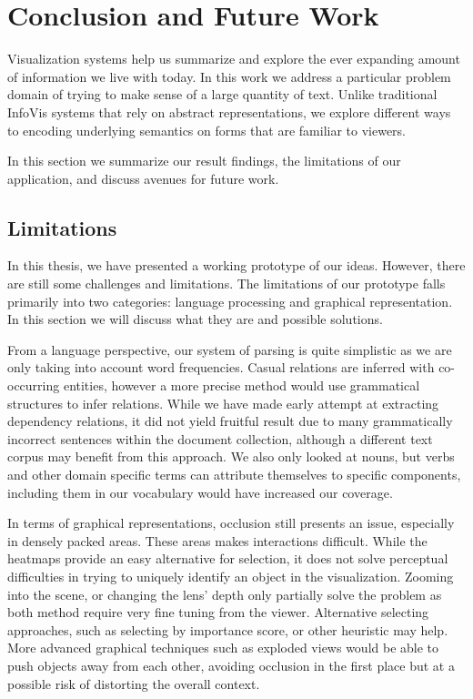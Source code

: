 %
\chapter{Conclusion and Future Work}
Visualization systems help us summarize and explore the ever expanding amount of
information we live with today. In this work we address a particular problem
domain of trying to make sense of a large quantity of text. Unlike traditional
InfoVis systems that rely on abstract representations, we explore different ways
to encoding underlying semantics on forms that are familiar to viewers. 

In this section we summarize our result findings, the limitations of our
application, and discuss avenues for future work.

\section{Limitations}
In this thesis, we have presented a working prototype of our ideas. However,
there are still some challenges and limitations. The limitations of our
prototype falls primarily into two categories: language processing and graphical
representation. In this section we will discuss what they are and possible
solutions.

From a language perspective, our system of parsing is quite simplistic as we are
only taking into account word frequencies. Casual relations are inferred with
co-occurring entities, however a more precise method would use grammatical
structures to infer relations. While we have made early attempt at extracting
dependency relations, it did not yield fruitful result due to many grammatically
incorrect sentences within the document collection, although a different text
corpus may benefit from this approach. We also only looked at nouns, but verbs
and other domain specific terms can attribute themselves to specific components,
including them in our vocabulary would have increased our coverage.

In terms of graphical representations, occlusion still presents an issue,
especially in densely packed areas. These areas makes interactions difficult.
While the heatmaps provide an easy alternative for selection, it does not solve
perceptual difficulties in trying to uniquely identify an object in the
visualization. Zooming into the scene, or changing the lens' depth only
partially solve the problem as both method require very fine tuning from the
viewer. Alternative selecting approaches, such as selecting by importance score,
or other heuristic may help. More advanced graphical techniques such as exploded
views would be able to push objects away from each other, avoiding occlusion in
the first place but at a possible risk of distorting the overall context.


